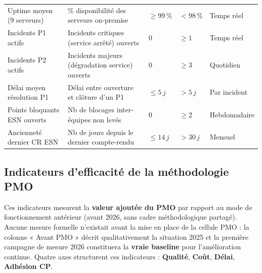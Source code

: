 \documentclass[11pt,a4paper,oneside]{report}
\begin{document}
\vspace{4pt}
\begin{center}
\renewcommand{\arraystretch}{1.5}
\begin{tabularx}{\textwidth}{L{4.5cm} L{4cm} C{2cm} C{2cm} L{2cm}}
\toprule
{}
 &  &  &  &  \\
\midrule
Uptime moyen (9 serveurs) & \% disponibilité des serveurs on-premise & $\geq 99\,\%$ & $< 98\,\%$ & Temps réel \\
Incidents P1 actifs & Incidents critiques (service arrêté) ouverts & 0 & $\geq 1$ & Temps réel \\
Incidents P2 actifs & Incidents majeurs (dégradation service) ouverts & 0 & $\geq 3$ & Quotidien \\
Délai moyen résolution P1 & Délai entre ouverture et clôture d'un P1 & $\leq 5\,j$ & $> 5\,j$ & Par incident \\
Points bloquants ESN ouverts & Nb de blocages inter-équipes non levés & 0 & $\geq 2$ & Hebdomadaire \\
Ancienneté dernier CR ESN & Nb de jours depuis le dernier compte-rendu & $\leq 14\,j$ & $> 30\,j$ & Mensuel \\
\bottomrule
\end{tabularx}
\end{center}

\subsection*{Indicateurs d'efficacité de la méthodologie PMO}

\begin{finding}
Ces indicateurs mesurent la \textbf{valeur ajoutée du PMO} par rapport au mode de fonctionnement antérieur (avant 2026, sans cadre méthodologique partagé). Aucune mesure formelle n'existait avant la mise en place de la cellule PMO : la colonne « Avant PMO » décrit qualitativement la situation 2025 et la première campagne de mesure 2026 constituera la \textbf{vraie baseline} pour l'amélioration continue. Quatre axes structurent ces indicateurs : \textbf{Qualité}, \textbf{Coût}, \textbf{Délai}, \textbf{Adhésion CP}.
\end{finding}
\end{document}
